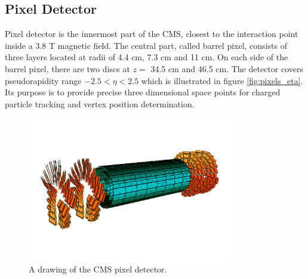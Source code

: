 \subsection{Pixel Detector}

Pixel detector is the innermost part of the CMS, closest to the interaction point inside a 3.8 T magnetic field. The central part, called barrel pixel, consists of three layers located at radii of 4.4 cm, 7.3 cm and 11 cm. On each side of the barrel pixel, there are two discs at $z=$ 34.5 cm and 46.5 cm. The detector covers pseudorapidity range $-2.5<\eta<2.5$ which is illustrated in figure \ref{fig:pixels_eta}. Its purpose is to provide precise three dimensional space points for charged particle tracking and vertex position determination.
\begin{figure}[htbp]
	\centering
		\includegraphics[width=0.8\textwidth]{Figures/pixel_detector.png}
	\caption[CMS Pixel Detector]{A drawing of the CMS pixel detector. \cite{Chatrchyan:2008aa}}
	\label{fig:pixels}
\end{figure}

